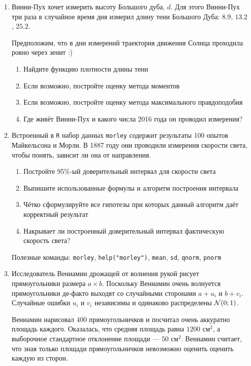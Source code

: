 \begin{enumerate}
\item Винни-Пух хочет измерить высоту Большого дуба, $d$. Для этого Винни-Пух три
раза в случайное время дня измерил длину тени Большого Дуба: $8.9$, $13.2$, $25.2$.

Предположим, что в дни измерений траектория движения Солнца проходила ровно через зенит :)

\begin{enumerate}
\item Найдите функцию плотности длины тени
\item Если возможно, постройте оценку метода моментов
\item Если возможно, постройте оценку метода максимального правдоподобия
\item Где живёт Винни-Пух и какого числа 2016 года он проводил измерения?
\end{enumerate}

\item Встроенный в \verb|R| набор данных \verb|morley| содержит результаты 100
опытов Майкельсона и Морли. В 1887 году они проводили измерения скорости света,
чтобы понять, зависит ли она от направления.

\begin{enumerate}
\item Постройте 95\%-ый доверительный интервал для скорости света
\item Выпишите использованные формулы и алгоритм построения интервала
\item Чётко сформулируйте все гипотезы при которых данный алгоритм даёт корректный результат
\item Накрывает ли построенный доверительный интервал фактическую скорость света?
\end{enumerate}

Полезные команды: \verb|morley|, \verb|help("morley")|, \verb|mean|, \verb|sd|,
\verb|qnorm|, \verb|pnorm|

\item  Исследователь Вениамин дрожащей от волнения рукой рисует прямоугольники
размера $a\times b$. Поскольку Вениамин очень волнуется прямоугольники де-факто
выходят со случайными сторонами $a+u_i$ и $b+v_i$. Случайные ошибки $u_i$ и $v_i$
независимы и одинаково распределены $\mathcal{N}(0;1)$.

Вениамин нарисовал 400 прямоугольничков и посчитал очень аккуратно площадь каждого.
Оказалась, что средняя площадь равна $1200$ см$^2$, а выборочное стандартное
отклонение площади — $50$ см$^2$. Вениамин считает, что зная только площади
прямоугольничков невозможно оценить оценить каждую из сторон.


\end{enumerate}
